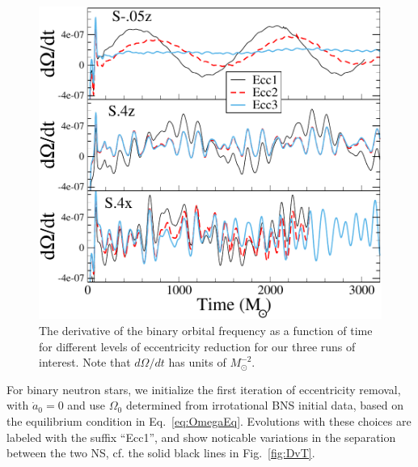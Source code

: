 \begin{figure}
\includegraphics[width=0.95\columnwidth]{chap2/DOmegaVT}
\caption[The derivative of the binary orbital frequency at different levels of eccentricity reduction.]{{\label{fig:DOmegaVT}} The derivative of the binary orbital
  frequency as a function of time for different levels of
  eccentricity reduction for our three runs of interest. Note that
  $d\Omega/dt$ has units of $M_{\odot}^{-2}$. }
\end{figure}


For binary neutron stars, we initialize the first iteration
of eccentricity removal, with $\dot{a}_0=0$ and use
$\Omega_0$ determined from irrotational BNS initial data, based on
the equilibrium condition in Eq.~\ref{eq:OmegaEq}. Evolutions with
these choices are labeled with the suffix ``Ecc1'', and show noticable
variations in the separation between the two NS, cf. the solid black
lines in Fig.~\ref{fig:DvT}.

